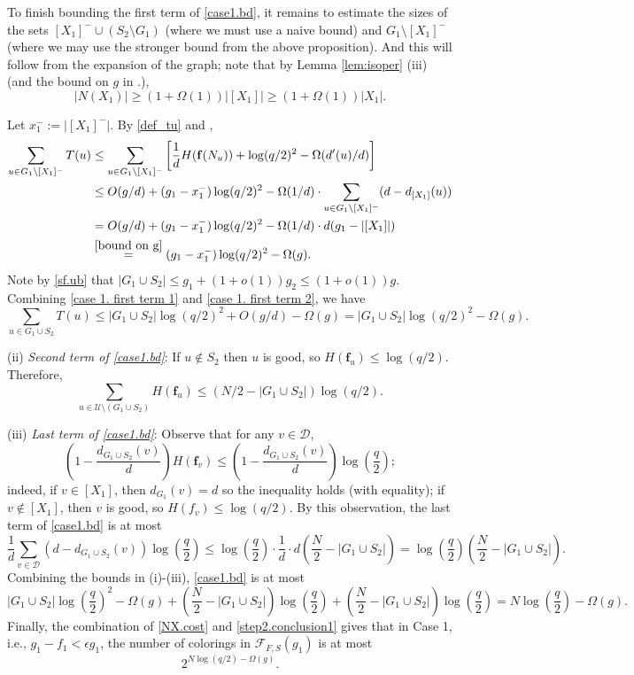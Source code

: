 \documentclass{amsart}
\theoremstyle{definition}
\newcommand{\gO}{\Omega}
\newcommand{\cD}{\mathcal{D} }
\newcommand{\cF}{\mathcal{F} }
\newcommand{\cU}{\mathcal{U} }
\newcommand{\bbf}{\mathbf{f}}
\newcommand{\beq}[1]{\begin{equation}\label{#1}}
\newcommand{\enq}[0]{\end{equation}}
\newcommand{\eps}{\epsilon}
\newcommand{\nin}[0]{\noindent}
\newcommand{\0}[0]{\emptyset}
\newcommand{\qq}[0]{(q/2)^2}
\begin{document}
To finish bounding the first term of \eqref{case1.bd}, it remains to estimate the sizes of the sets $[X_1]^- \cup (S_2 \setminus G_1)$ (where we must use a naive bound) and $G_1\setminus [X_1]^-$ (where we may use the stronger bound from the above proposition). And this will follow from the expansion of the graph; note that by Lemma \ref{lem:isoper} (iii) (and the bound on $g$ in .), 
\beq{bound on g} |N(X_1)|\ge (1+\gO(1))|[X_1]|\ge (1+\gO(1))|X_1|. \enq

Let $x_1^-:=|[X_1]^-|$. By \eqref{def_tu} and ,
\beq{case 1. first term 2}\begin{split}\sum_{u \in G_1 \setminus [X_1]^-}T(u) &\le \sum_{u \in G_1 \setminus [X_1]^-} \left[ \frac{1}{d}H(\bbf(N_u))+\log \qq-\gO(d'(u)/d)\right]\\
&\le O(g/d) +(g_1-x_1^-)\log \qq -\gO(1/d)\cdot\sum_{u \in G_1 \setminus [X_1]^-}(d-d_{[X_1]}(u))\\
&=O(g/d)+(g_1-x_1^-)\log \qq-\gO(1/d)\cdot d(g_1-|[X_1]|)\\
&\stackrel{\eqref{bound on g}}{=}(g_1-x_1^-)\log\qq-\gO(g).\end{split}\enq
Note by \eqref{sf.ub} that $|G_1 \cup S_2|\leq g_1+(1 + o(1))g_2\leq (1 + o(1))g$.
Combining \eqref{case 1. first term 1} and \eqref{case 1. first term 2}, we have
\[\sum_{u \in G_1\cup S_2} T(u) \le |G_1 \cup S_2|\log \qq + O(g/d)-\gO(g)= |G_1 \cup S_2|\log \qq - \gO(g).\]

\nin (ii) \textit{Second term of \eqref{case1.bd}}: If $u \not \in S_2$ then $u$ is good, so $H(\bbf_u) \le \log (q/2)$. Therefore,
\[\sum_{u \in \cU \setminus (G_1 \cup S_2)} H(\bbf_u) \le (N/2-|G_1 \cup S_2|)\log(q/2).\]

\nin (iii) \textit{Last term of \eqref{case1.bd}}:  Observe that for any $v \in \cD$,
\beq{eq.1}\left(1-\frac{d_{G_1 \cup S_2}(v)}{d}\right)H(\bbf_v) \le \left(1-\frac{d_{G_1 \cup S_2}(v)}{d}\right)\log\left(\frac{q}{2}\right);\enq
indeed, if $v \in [X_1]$, then $d_{G_1}(v)=d$ so the inequality holds (with equality); if $v \not\in [X_1]$, then $v$ is good, so $H(f_v) \le \log(q/2)$. By this observation, the last term of \eqref{case1.bd} is at most
\[\frac{1}{d}\sum_{v \in \cD} (d-d_{G_1 \cup S_2}(v))\log\left(\frac{q}{2}\right) \le \log \left(\frac{q}{2}\right) \cdot \frac{1}{d} \cdot d\left(\frac N2-|G_1 \cup S_2|\right)=\log\left(\frac{q}{2}\right)\left(\frac N2-|G_1 \cup S_2|\right).\]
Combining the bounds in (i)-(iii), \eqref{case1.bd} is at most
\beq{step2.conclusion1}|G_1 \cup S_2|\log\left(\frac{q}{2}\right)^2-\gO(g)+\left(\frac N2-|G_1 \cup S_2|\right)\log \left(\frac{q}{2}\right) +\left(\frac N2-|G_1 \cup S_2|\right)\log \left(\frac{q}{2}\right)=N\log\left(\frac{q}{2}\right)-\gO(g).\enq
Finally, the combination of \eqref{NX.cost} and \eqref{step2.conclusion1} gives that in Case 1, i.e., $g_1 - f_1 < \eps g_1$, the number of colorings in $\cF_{F, S}(g_1)$ is at most \[
2^{N\log(q/2)-\gO(g)}.\]
\end{document}
